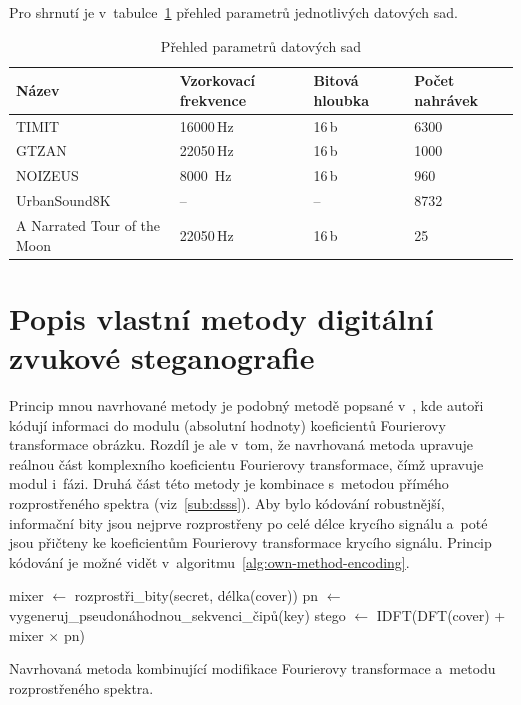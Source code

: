Pro shrnutí je v~tabulce~\ref{tab:datasets} přehled parametrů jednotlivých
datových sad.

\begin{table}[H]
    \vskip6pt
    \caption{Přehled parametrů datových sad}
    \vskip6pt
    \centering
    \begin{tabular}{llll}
        \toprule
        Název & Vzorkovací frekvence & Bitová hloubka & Počet nahrávek \\
        \midrule
        TIMIT & 16000\,Hz & 16\,b & 6300 \\
        GTZAN & 22050\,Hz & 16\,b & 1000 \\
        NOIZEUS & 8000\, Hz & 16\,b & 960 \\
        UrbanSound8K & -- & -- & 8732 \\
        A Narrated Tour of the Moon & 22050\,Hz & 16\,b & 25 \\
        \bottomrule
    \end{tabular}
    \label{tab:datasets}
\end{table}

\section{Popis vlastní metody digitální zvukové steganografie}
\label{sec:own-method-proposal}

Princip mnou navrhované metody je podobný metodě popsané v~\cite{Ramkumar1999},
kde autoři kódují informaci do modulu (absolutní hodnoty) koeficientů
Fourierovy transformace obrázku. Rozdíl je ale v~tom, že navrhovaná metoda
upravuje reálnou část komplexního koeficientu Fourierovy transformace, čímž
upravuje modul i~fázi. Druhá část této metody je kombinace s~metodou přímého
rozprostřeného spektra (viz~\ref{sub:dsss}). Aby bylo kódování robustnější,
informační bity jsou nejprve rozprostřeny po celé délce krycího signálu a~poté
jsou přičteny ke koeficientům Fourierovy transformace krycího signálu. Princip
kódování je možné vidět v~algoritmu~\ref{alg:own-method-encoding}.

\begin{algorithm}
    \SetNlSty{}{}{:}
    \LinesNumbered
    \DontPrintSemicolon
    \SetInd{0.4em}{1em}
    \SetNlSkip{0.4em}
    \Indm
    \Indp
    \BlankLine
    \SetInd{1em}{1em}
    mixer $\gets$ rozprostři\_bity(secret, délka(cover))\;
    pn $\gets$ vygeneruj\_pseudonáhodnou\_sekvenci\_čipů(key)\;
    stego $\gets$ IDFT(DFT(cover) + mixer $\times$ pn)\;
    \caption{Navrhovaná metoda kombinující modifikace Fourierovy transformace
    a~metodu rozprostřeného spektra.}
    \label{alg:own-method-encoding}
\end{algorithm}

